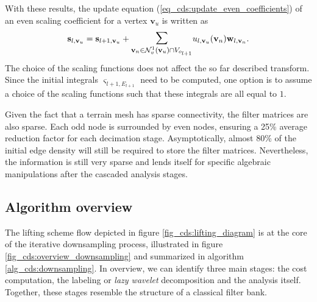 \documentclass[graybox]{svmult}
\begin{document}
	With these results, the update equation (\ref{eq_cds:update_even_coefficients}) of an even scaling coefficient for a vertex $\mathbf{v}_u$ is written as
	\begin{equation}
	\mathbf{s}_{l, \mathbf{v}_u} = \mathbf{s}_{l+1,\mathbf{v}_u} + \mathlarger{\mathlarger{\sum}}_{\mathbf{v}_n \in \mathcal{N}_v^1(\mathbf{v}_u) \cap V_{o_{l+1}}} { u_{l, \mathbf{v}_u}(\mathbf{v}_n) \mathbf{w}_{l,\mathbf{v}_n} }.
	\label{eq_cds:update_even_scaling_coefficient}
	\end{equation}
	The choice of the scaling functions does not affect the so far described transform. Since the initial integrals $\varsigma_{l+1,E_{l+1}}$ need to be computed, one option is to assume a
	choice of the scaling functions such that these integrals are all equal to $1$.
	
	
	Given the fact that a terrain mesh has sparse connectivity, the filter matrices are also sparse. Each odd node is surrounded 
	by even nodes, ensuring a 25\% average reduction factor for each decimation stage. Asymptotically, almost 80\% of the initial edge density will still be required to store the 
	filter matrices. Nevertheless, the information is still very sparse and lends itself for specific algebraic manipulations after the cascaded analysis stages. 
	
	\subsection{Algorithm overview}
	The lifting scheme flow depicted in figure \ref{fig_cds:lifting_diagram} is at the core of the iterative downsampling process, illustrated in figure \ref{fig_cds:overview_downsampling} and summarized in algorithm \ref{alg_cds:downsampling}. In overview, we can identify three main stages: the cost computation, the labeling or \emph{lazy wavelet} decomposition and the analysis itself. Together, these stages resemble the structure of a classical filter bank.
	
\end{document}
